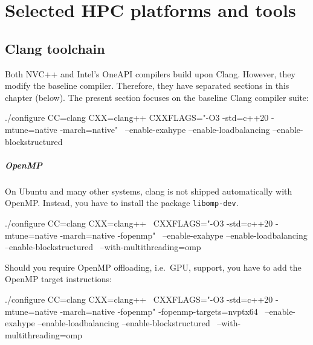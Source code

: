 \chapter{Selected HPC platforms and tools}
\label{chapter:selected-HPC-platforms}


\section{Clang toolchain}

 Both NVC++ and Intel's OneAPI compilers build upon Clang. However, they modify
 the baseline compiler. Therefore, they have separated sections in this chapter
 (below).
 The present section focuses on the baseline Clang compiler suite:

\begin{bash}
./configure CC=clang CXX=clang++ CXXFLAGS="-O3 -std=c++20 -mtune=native -march=native" \
 --enable-exahype --enable-loadbalancing --enable-blockstructured
\end{bash}


\paragraph{OpenMP}

\begin{remark}
 On Ubuntu and many other systems, clang is not shipped automatically with
 OpenMP. Instead, you have to install the package \texttt{libomp-dev}.
\end{remark}

\begin{bash}
./configure CC=clang CXX=clang++ \
 CXXFLAGS="-O3 -std=c++20 -mtune=native -march=native -fopenmp" \
 --enable-exahype --enable-loadbalancing --enable-blockstructured \
 --with-multithreading=omp 
\end{bash}

Should you require OpenMP offloading, i.e.~GPU, support, you have to add the
OpenMP target instructions:

\begin{bash}
./configure CC=clang CXX=clang++ \
 CXXFLAGS="-O3 -std=c++20 -mtune=native -march=native -fopenmp" -fopenmp-targets=nvptx64 \
 --enable-exahype --enable-loadbalancing --enable-blockstructured \
 --with-multithreading=omp 
\end{bash}


% 
% 
% 
% 
% 
% 

